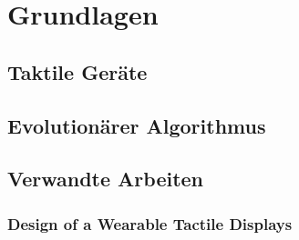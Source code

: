 
\chapter{Grundlagen}
\label{ch:Grundlagen}


\section{Taktile Ger{\"a}te}
\label{ch:Grundlagen:sec:Taktile Ger{\"a}te}






\section{Evolution{\"a}rer Algorithmus}
\label{ch:Grundlagen:sec:Genetischer Algorithmus}




\section{Verwandte Arbeiten}
\label{ch:Grundlagen:sec:RelatedWork}




\subsection{Design of a Wearable Tactile Displays}




